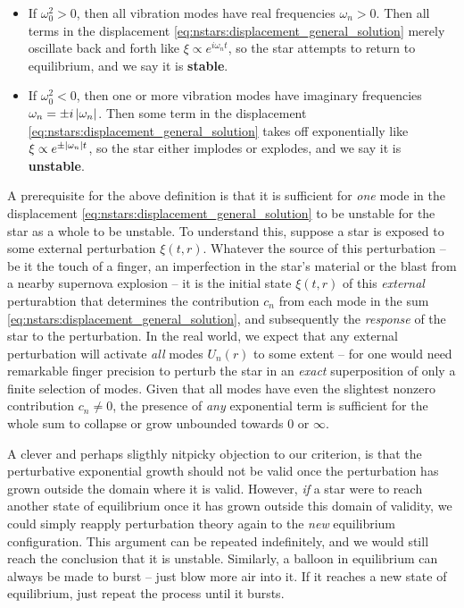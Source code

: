 \begin{itemize}
\item If $\omega_0^2 > 0$, then all vibration modes have real frequencies $\omega_n > 0$.
      Then all terms in the displacement \eqref{eq:nstars:displacement_general_solution} merely oscillate back and forth like $\xi \propto e^{i \omega_n t}$, so the star attempts to return to equilibrium, and we say it is \textbf{stable}.
\item If $\omega_0^2 < 0$, then one or more vibration modes have imaginary frequencies $\omega_n = \pm i \left\lvert \omega_n \right\rvert$.
      Then some term in the displacement \eqref{eq:nstars:displacement_general_solution} takes off exponentially like $\xi \propto e^{\pm \left\lvert \omega_n \right\rvert t}$, so the star either implodes or explodes, and we say it is \textbf{unstable}.
\end{itemize}
A prerequisite for the above definition is that it is sufficient for \emph{one} mode in the displacement \eqref{eq:nstars:displacement_general_solution} to be unstable for the star as a whole to be unstable.
To understand this, suppose a star is exposed to some external perturbation $\xi(t,r)$.
Whatever the source of this perturbation -- be it the touch of a finger, an imperfection in the star's material or the blast from a nearby supernova explosion -- it is the initial state $\xi(t,r)$ of this \emph{external} perturabtion that determines the contribution $c_n$ from each mode in the sum \eqref{eq:nstars:displacement_general_solution}, and subsequently the \emph{response} of the star to the perturbation.
In the real world, we expect that any external perturbation will activate \emph{all} modes $U_n(r)$ to some extent -- for one would need remarkable finger precision to perturb the star in an \emph{exact} superposition of only a finite selection of modes.
Given that all modes have even the slightest nonzero contribution $c_n \neq 0$, the presence of \emph{any} exponential term is sufficient for the whole sum to collapse or grow unbounded towards $0$ or $\infty$.

A clever and perhaps sligthly nitpicky objection to our criterion, is that the perturbative exponential growth should not be valid once the perturbation has grown outside the domain where it is valid.
However, \emph{if} a star were to reach another state of equilibrium once it has grown outside this domain of validity, we could simply reapply perturbation theory again to the \emph{new} equilibrium configuration.
This argument can be repeated indefinitely, and we would still reach the conclusion that it is unstable.
Similarly, a balloon in equilibrium can always be made to burst -- just blow more air into it.
If it reaches a new state of equilibrium, just repeat the process until it bursts.

